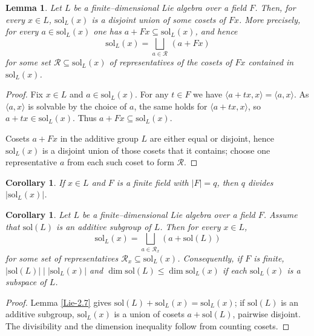 \documentclass[11pt]{amsart}
\theoremstyle{plain}
\newtheorem{corollary}[theorem]{Corollary}
\newtheorem{lemma}[theorem]{Lemma}
\def\sol{\mathrm{sol}}
\begin{document}
\begin{lemma}\label{Lie-2.12}
Let $L$ be a finite–dimensional Lie algebra over a field $F$. Then, for every $x\in L$, $\sol_L(x)$ is a disjoint union of some cosets of $Fx$. More precisely, for every $a\in \sol_L(x)$ one has $a + F x \subseteq \sol_L(x)$, and hence
\[\sol_L(x) = \bigsqcup_{a\in\mathcal R}\,(a+F x)\]
for some set $\mathcal R\subseteq \sol_L(x)$ of representatives of the
cosets of $F x$ contained in $\sol_L(x)$.
\end{lemma}

\begin{proof}
Fix $x\in L$ and $a\in \sol_L(x)$. For any $t\in F$ we have $\langle a+ t x, x\rangle = \langle a, x\rangle$.
As $\langle a,x\rangle$ is solvable by the choice of $a$, the same holds for $\langle a+t x,x\rangle$, so $a+t x\in \sol_L(x)$. Thus $a+F x\subseteq \sol_L(x)$.

Cosets $a+F x$ in the additive group $L$ are either equal or disjoint, hence $\sol_L(x)$ is a disjoint union of those cosets that it contains; choose one representative $a$ from each such coset to form $\mathcal{R}$.
\end{proof}

\begin{corollary}\label{divisible-by-q}
If $x\in L$ and $F$ is a finite field with $|F|=q$, then $q$ divides $|\sol_L(x)|$. 
\end{corollary}


\begin{corollary}\label{partition-by-SolL}
Let $L$ be a finite–dimensional Lie algebra over a field $F$. Assume that $\sol(L)$ is an additive subgroup of $L$.
Then for every $x\in L$,
\[\sol_L(x) = \bigsqcup_{a\in\mathcal R_x} (a+\sol(L))\]
for some set of representatives $\mathcal R_x\subseteq \sol_L(x)$.
Consequently, if $F$ is finite, $|\sol(L)| \mid |\sol_L(x)|$ and $\dim\sol(L) \leq \dim\sol_L(x)$ if each $\sol_L(x)$ is a subspace of $L$.
\end{corollary}

\begin{proof}
Lemma \ref{Lie-2.7} gives $\sol(L)+\sol_L(x)=\sol_L(x)$; if $\sol(L)$ is an additive subgroup, $\sol_L(x)$ is a union of cosets $a+\sol(L)$,
pairwise disjoint. The divisibility and the dimension inequality follow from counting cosets. 
\end{proof}
\end{document}
